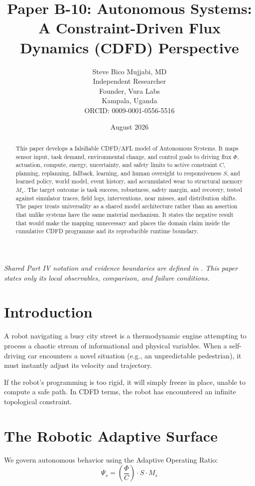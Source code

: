 \documentclass[11pt,a4paper]{article}
\title{\textbf{Paper B-10: Autonomous Systems:\\ A Constraint-Driven Flux Dynamics (CDFD) Perspective}}
\author{Steve Bico Mujjabi, MD\\
\small Independent Researcher\\
\small Founder, Vura Labs\\
\small Kampala, Uganda\\
\small ORCID: 0009-0001-0556-5516}
\date{August 2026}
\begin{document}
\maketitle

\noindent\textit{Shared Part IV notation and evidence boundaries are defined in . This paper states only its local observables, comparison, and failure conditions.}


\begin{abstract}
This paper develops a falsifiable CDFD/AFL model of Autonomous Systems. It maps sensor input, task demand, environmental change, and control goals to driving flux $\Phi$, actuation, compute, energy, uncertainty, and safety limits to active constraint $C$, planning, replanning, fallback, learning, and human oversight to responsiveness $S$, and learned policy, world model, event history, and accumulated wear to structural memory $M_s$. The target outcome is task success, robustness, safety margin, and recovery, tested against simulator traces, field logs, interventions, near misses, and distribution shifts. The paper treats universality as a shared model architecture rather than an assertion that unlike systems have the same material mechanism. It states the negative result that would make the mapping unnecessary and places the domain claim inside the cumulative CDFD programme and its reproducible runtime boundary.
\end{abstract}

\section{Introduction}

A robot navigating a busy city street is a thermodynamic engine attempting to process a chaotic stream of informational and physical variables. When a self-driving car encounters a novel situation (e.g., an unpredictable pedestrian), it must instantly adjust its velocity and trajectory.

If the robot's programming is too rigid, it will simply freeze in place, unable to compute a safe path. In CDFD terms, the robot has encountered an infinite topological constraint.

\section{The Robotic Adaptive Surface}
We govern autonomous behavior using the Adaptive Operating Ratio:
\begin{equation}
    \Psi_s = \left( \frac{\Phi}{C} \right) \cdot S \cdot M_s
\end{equation}
\end{document}
